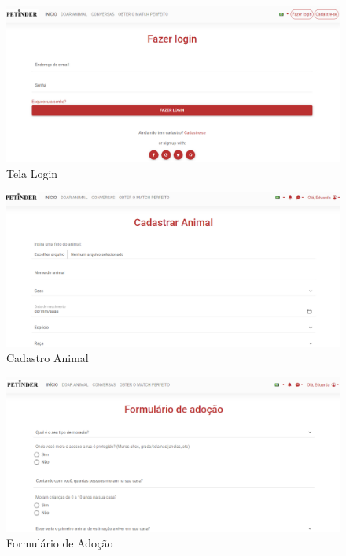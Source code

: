 \begin{apendicesenv}
\begin{flushleft}
\begin{figure}[!htbp]
    \centering
    \caption{\label{Tela Login}Tela Login}
	\includegraphics[scale=0.50,angle=0]{imagens/TelaLogin.png}
\end{figure}

\begin{figure}[!htbp]
    \centering
    \caption{\label{Cadastro Animal}Cadastro Animal}
	\includegraphics[scale=0.50,angle=0]{imagens/CadastroAnimal.png}
\end{figure}

\begin{figure}[!htbp]
    \centering
    \caption{\label{Formulario}Formulário de Adoção}
	\includegraphics[scale=0.50,angle=0]{imagens/Filtros.png}
\end{figure}


\end{flushleft}
\end{apendicesenv}
